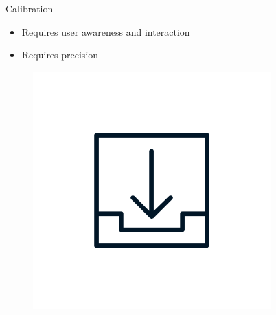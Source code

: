\documentclass[aspectratio=169]{beamer}
[aspectratio=169] %
\begin{document}
\begin{frame}{Calibration}
  \begin{minipage}{0.49\textwidth} 
    \begin{itemize}
      \item Requires user awareness and interaction
      \item Requires precision
    \end{itemize}
  \end{minipage}
  \hfill
  \begin{minipage}{0.49\textwidth} 
    \begin{figure}
      \centering
      \includegraphics[height=0.5\textheight]{figures/download.png}
    \end{figure}
  \end{minipage}
\end{frame}

\end{document}

